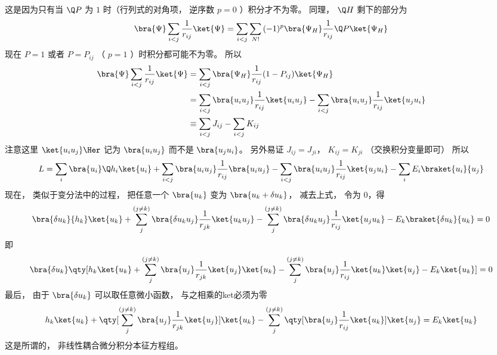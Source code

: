 这是因为只有当 $\Q P$ 为 $1$ 时（行列式的对角项， 逆序数 $p = 0$ ）积分才不为零。 同理， $\Q H$ 剩下的部分为
\begin{equation}
\bra{\Psi}\sum_{i < j} \frac{1}{r_{ij}} \ket{\Psi}  = \sum_{i < j} \sum_{N!} {(-1)^p}\bra{\Psi_H}\frac{1}{r_{ij}} \Q P \ket{\Psi_H}
\end{equation}
现在 $P = 1$ 或者 $P = P_{ij}$ （ $p=1$ ）时积分都可能不为零。 所以
\begin{equation}
\begin{aligned}
\bra{\Psi}\sum_{i < j} \frac{1}{r_{ij}} \ket{\Psi} & = \sum_{i < j} \bra{\Psi_H}\frac{1}{r_{ij}}(1 - P_{ij}) \ket{\Psi_H} \\
&= \sum_{i < j} \bra{u_i u_j}\frac{1}{r_{ij}}\ket{u_i u_j}  - \sum_{i < j} \bra{u_i u_j} \frac{1}{r_{ij}} \ket{u_j u_i}\\
& \equiv \sum_{i < j} J_{ij} - \sum_{i < j} K_{ij}\\ 
\end{aligned}
\end{equation}
注意这里 $\ket{u_i u_j}\Her$ 记为 $\bra{u_i u_j}$ 而不是 $\bra{u_j u_i}$。  另外易证 $J_{ij} = J_{ji}$， $K_{ij} = K_{ji}$ （交换积分变量即可） 所以
\begin{equation}
L = \sum_i \bra{u_i} \Q h_i \ket{u_i}  + \sum_{i< j} \bra{u_i u_j}\frac{1}{r_{ij}} \bra{u_i u_j}  - \sum_{i < j} \bra{u_i u_j} \frac{1}{r_{ij}} \ket{u_j u_i}   - \sum_i E_i \braket{u_i}{u_j}
\end{equation}
现在， 类似于变分法中的过程， 把任意一个 $\bra{u_k}$ 变为 $\bra{u_k + \delta u_k}$，  减去上式， 令为 $0$，得
 \begin{equation}
\bra{\delta u_k}{h_k}\ket{u_k}  + \sum_j^{(j \ne k)} \bra{\delta u_k u_j} \frac{1}{r_{jk}} \ket{u_k u_j}  - \sum_j^{(j \ne k)} \bra{\delta u_k u_j}\frac{1}{r_{ij}}\ket{u_j u_k} - E_k \braket{\delta u_k}{u_k}  = 0
\end{equation}
即
 \begin{equation}
\bra{\delta u_k} \qty[h_k \ket{u_k}  + \sum_j^{(j \ne k)} \bra{u_j} \frac{1}{r_{jk}} \ket{u_j} \ket{u_k}  - \sum_j^{(j \ne k)} \bra{u_j}\frac{1}{r_{ij}}\ket{u_k}\ket{u_j}  - E_k\ket{u_k}] = 0
\end{equation}
最后， 由于 $\bra{\delta u_k}$ 可以取任意微小函数， 与之相乘的ket必须为零
\begin{equation}
h_k \ket{u_k}  + \qty[\sum_j^{(j \ne k)} \bra{u_j}\frac{1}{r_{jk}} \ket{u_j}] \ket{u_k}  - \sum_j^{(j \ne k)} \qty[\bra{u_j}\frac{1}{r_{ij}} \ket{u_k}] \ket{u_j} = E_k\ket{u_k} 
\end{equation}
这是所谓的， 非线性耦合微分积分本征方程组。

